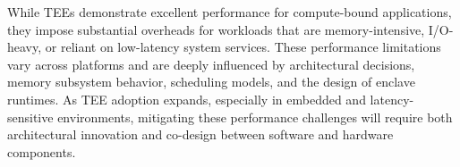 While TEEs demonstrate excellent performance for compute-bound applications, they impose substantial overheads for workloads that are memory-intensive, I/O-heavy, or reliant on low-latency system services. These performance limitations vary across platforms and are deeply influenced by architectural decisions, memory subsystem behavior, scheduling models, and the design of enclave runtimes. As TEE adoption expands, especially in embedded and latency-sensitive environments, mitigating these performance challenges will require both architectural innovation and co-design between software and hardware components.

